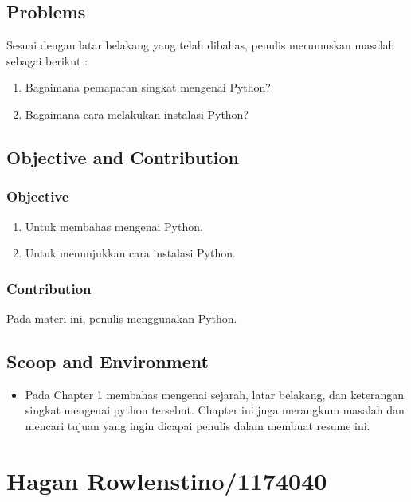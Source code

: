 \subsection{Problems}
Sesuai dengan latar belakang yang telah dibahas, penulis merumuskan masalah sebagai berikut : 
\begin{enumerate}	
	\item Bagaimana pemaparan singkat mengenai Python?
	\item Bagaimana cara melakukan instalasi Python?
\end{enumerate}

\subsection{Objective and Contribution}
\subsubsection{Objective}
\begin{enumerate}
	\item Untuk membahas mengenai Python.
	\item Untuk menunjukkan cara instalasi Python.
\end{enumerate}

\subsubsection{Contribution}
Pada materi ini, penulis menggunakan Python.

\subsection{Scoop and Environment}
\begin{itemize}
	\item Pada Chapter 1 membahas mengenai sejarah, latar belakang, dan keterangan singkat mengenai python tersebut. Chapter ini juga merangkum masalah dan mencari tujuan yang ingin dicapai penulis dalam membuat resume ini.
\end{itemize}

\section{Hagan Rowlenstino/1174040}
